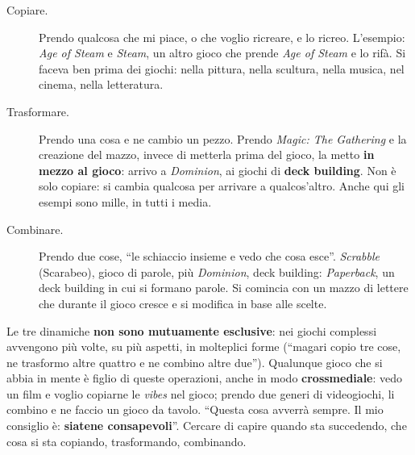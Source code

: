 \begin{description}
  \item[Copiare.] Prendo qualcosa che mi piace, o che voglio ricreare, e lo ricreo.
        L'esempio: \emph{Age of Steam} e \emph{Steam}, un altro gioco che prende
        \emph{Age of Steam} e lo rifà. Si faceva ben prima dei giochi: nella
        pittura, nella scultura, nella musica, nel cinema, nella letteratura.
  \item[Trasformare.] Prendo una cosa e ne cambio un pezzo. Prendo \emph{Magic: The
        Gathering} e la creazione del mazzo, invece di metterla prima del gioco, la
        metto \textbf{in mezzo al gioco}: arrivo a \emph{Dominion}, ai giochi di
        \textbf{deck building}. Non è solo copiare: si cambia qualcosa per arrivare a
        qualcos'altro. Anche qui gli esempi sono mille, in tutti i media.
  \item[Combinare.] Prendo due cose, ``le schiaccio insieme e vedo che cosa esce''.
        \emph{Scrabble} (Scarabeo), gioco di parole, più \emph{Dominion}, deck
        building: \emph{Paperback}, un deck building in cui si formano parole. Si
        comincia con un mazzo di lettere che durante il gioco cresce e si modifica in
        base alle scelte.
\end{description}

Le tre dinamiche \textbf{non sono mutuamente esclusive}: nei giochi complessi
avvengono più volte, su più aspetti, in molteplici forme (``magari copio tre cose, ne
trasformo altre quattro e ne combino altre due''). Qualunque gioco che si abbia in
mente è figlio di queste operazioni, anche in modo \textbf{crossmediale}: vedo un film
e voglio copiarne le \emph{vibes} nel gioco; prendo due generi di videogiochi, li
combino e ne faccio un gioco da tavolo. ``Questa cosa avverrà sempre. Il mio consiglio
è: \textbf{siatene consapevoli}''. Cercare di capire quando sta succedendo, che cosa si
sta copiando, trasformando, combinando.

